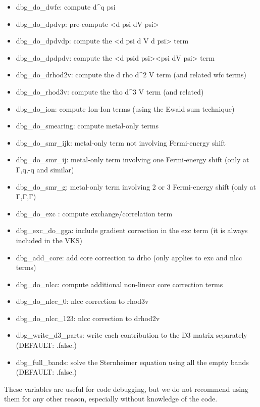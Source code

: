 \documentclass[
]{article}
\providecommand{\tightlist}{%
  \setlength{\itemsep}{0pt}\setlength{\parskip}{0pt}}
\begin{document}
\begin{itemize}
\tightlist
\item
  dbg\_do\_dwfc: compute d\^{}q psi
\item
  dbg\_do\_dpdvp: pre-compute \textless d psi\textbar{} dV\textbar{}
  psi\textgreater{}
\item
  dbg\_do\_dpdvdp: compute the \textless d psi\textbar{} d V\textbar{} d
  psi\textgreater{} term
\item
  dbg\_do\_dpdpdv: compute the \textless d psi\textbar d
  psi\textgreater\textless psi\textbar{} dV \textbar psi\textgreater{}
  term
\item
  dbg\_do\_drhod2v: compute the d rho d\^{}2 V term (and related wfc
  terms)
\item
  dbg\_do\_rhod3v: compute the tho d\^{}3 V term (and related)
\item
  dbg\_do\_ion: compute Ion-Ion terms (using the Ewald sum technique)
\item
  dbg\_do\_smearing: compute metal-only terms
\item
  dbg\_do\_smr\_ijk: metal-only term not involving Fermi-energy shift
\item
  dbg\_do\_smr\_ij: metal-only term involving one Fermi-energy shift
  (only at Γ,q,-q and similar)
\item
  dbg\_do\_smr\_g: metal-only term involving 2 or 3 Fermi-energy shift
  (only at Γ,Γ,Γ)
\item
  dbg\_do\_exc : compute exchange/correlation term
\item
  dbg\_exc\_do\_gga: include gradient correction in the exc term (it is
  always included in the VKS)
\item
  dbg\_add\_core: add core correction to drho (only applies to exc and
  nlcc terms)
\item
  dbg\_do\_nlcc: compute additional non-linear core correction terms
\item
  dbg\_do\_nlcc\_0: nlcc correction to rhod3v
\item
  dbg\_do\_nlcc\_123: nlcc correction to drhod2v
\item
  dbg\_write\_d3\_parts: write each contribution to the D3 matrix
  separately (DEFAULT: .false.)
\item
  dbg\_full\_bands: solve the Sternheimer equation using all the empty
  bands (DEFAULT: .false.)
\end{itemize}

These variables are useful for code debugging, but we do not recommend
using them for any other reason, especially without knowledge of the
code.
\end{document}
